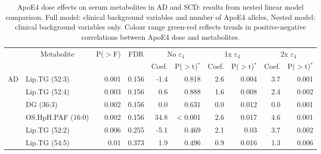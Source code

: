 \documentclass{amsart}
\begin{document}
\begin{table}[H]
\caption{ApoE4 dose effects on serum metabolites in AD and SCD: results from nested linear model comparison. Full model: clinical background variables and number of ApoE4 alleles, Nested model: clinical background variables only. Colour range green-red reflects trends in positive-negative correlations between ApoE4 dose and metabolites.}
\label{tab:nested}
\centering
\begin{threeparttable}
  \begin{tabular}{clrrrrrrrr} \toprule
    \multicolumn{1}{l}{} & \multicolumn{1}{c}{\multirow{2}{*}{Metabolite}} & \multicolumn{1}{c}{\multirow{2}{*}{P($>$F)}} & \multicolumn{1}{c}{\multirow{2}{*}{FDR}} & \multicolumn{2}{c}{No $\varepsilon_4$} & \multicolumn{2}{c}{1x $\varepsilon_4$} & \multicolumn{2}{c}{2x $\varepsilon_4$} \\
\multicolumn{1}{l}{} & \multicolumn{1}{c}{} & \multicolumn{1}{c}{} & \multicolumn{1}{c}{} & \multicolumn{1}{l}{Coef.} & \multicolumn{1}{l}{P($>$t)$^\ast$} & \multicolumn{1}{l}{Coef.} & \multicolumn{1}{l}{P($>$t)$^\ast$} & \multicolumn{1}{l}{Coef.} & \multicolumn{1}{l}{P($>$t)$^\ast$} \\ \midrule
  \multirow{19}{*}{AD} & Lip.TG (52:3) & 0.001 & 0.156 & {\cellcolor[rgb]{0.98,0.8,0.808}}-1.4 & 0.818 & {\cellcolor[rgb]{0.949,0.973,0.969}}2.6 & 0.004 & {\cellcolor[rgb]{0.929,0.965,0.949}}3.7 & 0.001 \\
   & Lip.TG (52:4) & 0.003 & 0.156 & {\cellcolor[rgb]{0.984,0.988,0.996}}0.6 & 0.888 & {\cellcolor[rgb]{0.969,0.98,0.98}}1.6 & 0.008 & {\cellcolor[rgb]{0.953,0.976,0.973}}2.4 & 0.002 \\
   & DG (36:3) & 0.002 & 0.156 & {\cellcolor[rgb]{0.984,0.957,0.969}}0.0 & 0.631 & {\cellcolor[rgb]{0.984,0.957,0.965}}0.0 & 0.012 & {\cellcolor[rgb]{0.984,0.957,0.969}}0.0 & 0.001 \\
   & OS.HpH.PAF (16:0) & 0.002 & 0.156 & {\cellcolor[rgb]{0.388,0.745,0.482}}34.8 & $<$0.001 & {\cellcolor[rgb]{0.949,0.973,0.969}}2.6 & 0.017 & {\cellcolor[rgb]{0.914,0.961,0.937}}4.6 & 0.001 \\
   & Lip.TG (52:2) & 0.006 & 0.255 & {\cellcolor[rgb]{0.973,0.412,0.42}}-5.1 & 0.469 & {\cellcolor[rgb]{0.957,0.976,0.976}}2.1 & 0.03 & {\cellcolor[rgb]{0.929,0.965,0.949}}3.7 & 0.002 \\
   & Lip.TG (54:5) & 0.01 & 0.373 & {\cellcolor[rgb]{0.965,0.98,0.98}}1.9 & 0.496 & {\cellcolor[rgb]{0.98,0.984,0.992}}0.9 & 0.016 & {\cellcolor[rgb]{0.973,0.984,0.988}}1.3 & 0.006 \\

\end{tabular}
\end{threeparttable}
\end{table}
\end{document}
